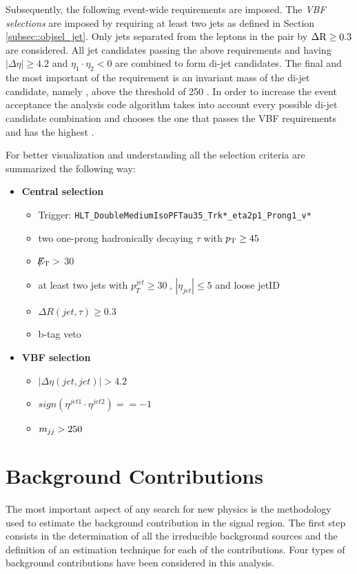 Subsequently, the following event-wide requirements are imposed. The {\textit {VBF selections}} are imposed by requiring at least two jets as defined in Section \ref{subsec::objsel_jet}. Only jets separated from the leptons in the \hadtau\hadtau pair by $\Delta \text{R} \ge 0.3$ are considered. All jet candidates passing the above requirements and having $\vert \Delta\eta \vert \ge 4.2$ and $\eta_{1}\cdot\eta_{2} < 0$ are combined to form di-jet candidates. The final and the most important of the requirement is an invariant mass of the di-jet candidate, namely \mjj, above the threshold of 250 \gev. In order to increase the event acceptance the analysis code algorithm takes into account every possible di-jet candidate combination and chooses the one that passes the VBF requirements and has the highest \mjj. 

For better visualization and understanding all the selection criteria are summarized the following way:

\begin{itemize}
	\item \textbf{Central selection}
	\begin{itemize}
		\item Trigger: \texttt{HLT\_DoubleMediumIsoPFTau35\_Trk*\_eta2p1\_Prong1\_v*}
		\item two one-prong hadronically decaying $\tau$ with $p_{\text{T}}\geq45~$\gev 
		\item $\slash\mkern-12mu{E}_{\text{T}} > $ 30
		\item at least two jets with $p_{T}^{jet}\geq30~$\gev, $|\eta_{jet}|\leq5$ and loose jetID
		\item $\Delta R(jet,\tau)\geq0.3$
		\item b-tag veto
	\end{itemize}
	\item \textbf{VBF selection}
	\begin{itemize}
		\item $|\Delta\eta(jet,jet)| > 4.2$
		\item $sign(\eta^{jet 1}\cdot\eta^{jet 2})==-1$
		\item $m_{jj}>250~$\gev
	\end{itemize}
\end{itemize}

\clearpage


\section{Background Contributions}
The most important aspect of any search for new physics is the methodology used to estimate the background contribution in the signal region. The first step consists in the determination of all the irreducible background sources and the definition of an estimation technique for each of the contributions. Four types of background contributions have been considered in this analysis. 

